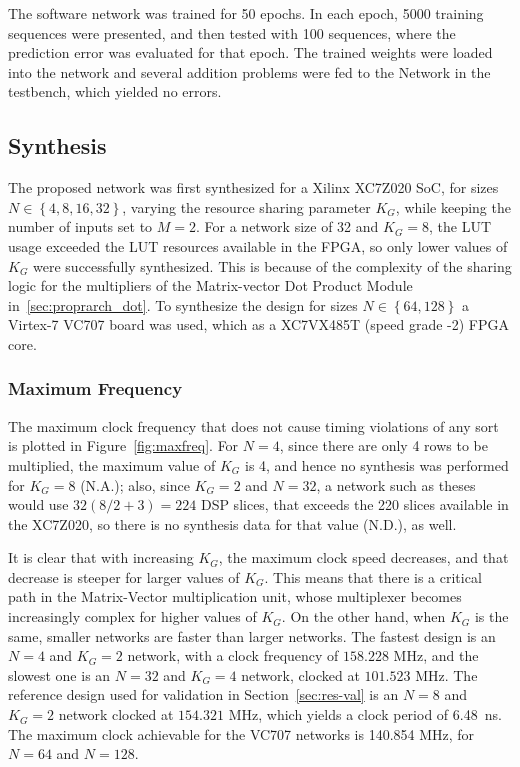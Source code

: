 \documentclass[conference]{IEEEtran}
\begin{document}
The software network was trained for 50 epochs. In each epoch, 5000 training sequences were presented, and then tested with 100 sequences, where the
prediction error was evaluated for that epoch. The trained weights were loaded into the network and several addition problems
were fed to the Network in the testbench, which yielded no errors.

\subsection{Synthesis}\label{sec:results_synth}
The proposed network was first synthesized for a Xilinx XC7Z020 SoC, for sizes $N \in \left\{4, 8, 16, 32\right\}$, varying the resource sharing parameter $K_G$, while keeping the number of inputs set
to $M=2$. For a network size of 32 and $K_G=8$, the LUT usage exceeded the LUT resources available in the FPGA, so only lower values of $K_G$ were
successfully synthesized. This is because of the complexity of the sharing logic for the multipliers of the Matrix-vector Dot Product Module in~\ref{sec:proprarch_dot}. To synthesize the
design for sizes $N \in \left\{64, 128 \right\}$ a Virtex-7 VC707 board was used, which as a XC7VX485T (speed grade -2) FPGA core.

\subsubsection{Maximum Frequency}\label{sec:results_synth_maxfreq}
The maximum clock frequency that does not cause timing violations of any sort is plotted in Figure~\ref{fig:maxfreq}. For $N=4$, since there are
only 4 rows to be multiplied, the maximum value of $K_G$ is 4, and hence no synthesis was performed for $K_G = 8$ (N.A.); also,
since $K_G = 2$ and $N=32$, a network such as theses would use $32(8/2+3) = 224$ DSP slices, that exceeds the 220 slices
available in the XC7Z020, so there is no synthesis data for that value (N.D.), as well.

It is clear that with increasing $K_G$, the maximum clock speed decreases, and that decrease is steeper for larger values
of $K_G$. This means that there is a critical path in the Matrix-Vector multiplication unit, whose multiplexer becomes
increasingly complex for higher values of $K_G$. On the other hand, when $K_G$ is the same, smaller networks are faster
than larger networks. The fastest design is an $N=4$ and $K_G = 2$ network, with a clock frequency of $158.228$ MHz, and
the slowest one is an $N=32$ and $K_G=4$ network, clocked at $101.523$ MHz. The reference design used for validation in
Section~\ref{sec:res-val} is an $N=8$ and $K_G=2$ network clocked at $154.321$ MHz, which yields a clock period of
\SI{6.48}{\nano\second}. The maximum clock achievable for the VC707 networks is 140.854 MHz, for $N=64$ and $N=128$.
\end{document}

